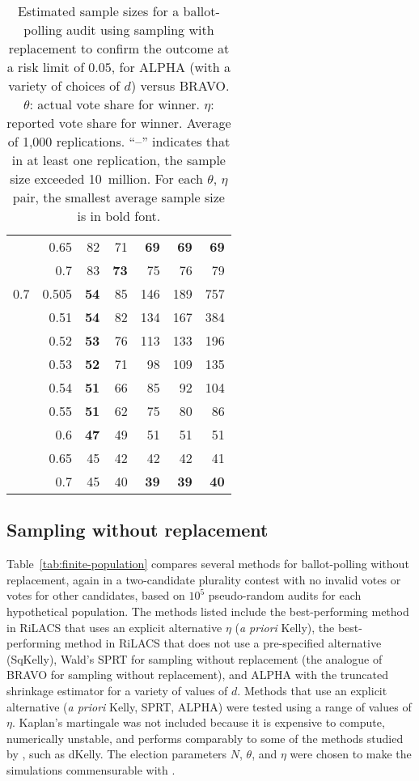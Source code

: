 \documentclass[aoas]{imsart}
\begin{document}
\begin{table}
\begin{tabular}{lr|rrrr|r}
     & 0.65 & 82 & 71 & \bf{69} & \bf{69} & \bf{69} \\
     & 0.7 & 83 & \bf{73} & 75 & 76 & 79 \\
\hline
0.7 & 0.505 & \bf{54} & 85 & 146 & 189 & 757 \\
     & 0.51 & \bf{54} & 82 & 134 & 167 & 384 \\
     & 0.52 & \bf{53} & 76 & 113 & 133 & 196 \\
     & 0.53 & \bf{52} & 71 & 98 & 109 & 135 \\
     & 0.54 & \bf{51} & 66 & 85 & 92 & 104 \\
     & 0.55 & \bf{51} & 62 & 75 & 80 & 86 \\
     & 0.6 & \bf{47} & 49 & 51 & 51 & 51 \\
     & 0.65 & 45 & 42 & 42 & 42 & 41 \\
     & 0.7 & 45 & 40 & \bf{39} & \bf{39} & \bf{40} 
\end{tabular}
\caption{\protect \label{tab:results} Estimated sample sizes for a ballot-polling audit using sampling with replacement
to confirm the outcome at a risk limit of $0.05$, for ALPHA (with a variety of choices of
$d$) versus BRAVO.
$\theta$: actual vote share for winner.
$\eta$: reported vote share for winner.
Average of 1,000 replications.
``--'' indicates that in at least one replication, the sample size exceeded 10~million.
For each $\theta$, $\eta$ pair, the smallest average sample size is in bold font.
}
\end{table}

\subsection{Sampling without replacement}
Table~\ref{tab:finite-population} compares several methods for ballot-polling without replacement, again in a two-candidate
plurality contest with no invalid votes or votes for other candidates, based on $10^5$ pseudo-random audits
for each hypothetical population.
The methods listed include the best-performing method in RiLACS \citep{waudby-smithEtal21} 
that uses an explicit alternative $\eta$ (\emph{a priori} Kelly), the best-performing method in RiLACS
that does not use a pre-specified alternative (SqKelly), 
Wald's SPRT for sampling without replacement (the analogue of BRAVO for sampling without replacement), and
ALPHA with the truncated shrinkage estimator for a variety of values of
$d$. 
Methods that use an explicit alternative (\emph{a priori} Kelly, SPRT, ALPHA) were tested using a range of values of $\eta$.
Kaplan's martingale \citep{stark20} was not included because it is expensive to compute, numerically unstable, and
performs comparably to some of the methods studied by \citet{waudby-smithEtal21}, such as dKelly.
The election parameters $N$, $\theta$, and $\eta$ were chosen to make the simulations commensurable with 
\citet{huangEtal20}.
\end{document}
